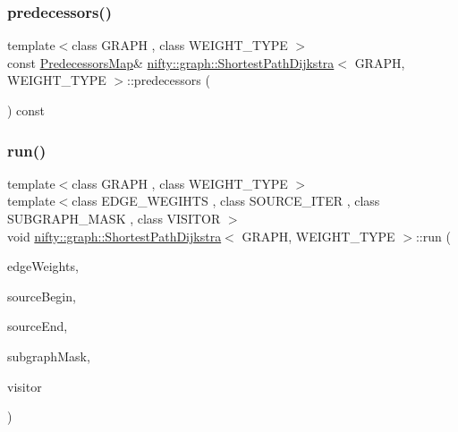 \mbox{\label{classnifty_1_1graph_1_1ShortestPathDijkstra_af00403d368fb8128d37a8bc736631245}} 
\subsubsection{\texorpdfstring{predecessors()}{predecessors()}}
{\footnotesize\ttfamily template$<$class G\+R\+A\+PH , class W\+E\+I\+G\+H\+T\+\_\+\+T\+Y\+PE $>$ \\
const \hyperlink{classnifty_1_1graph_1_1ShortestPathDijkstra_a87227c1cb37963c6a826889c693ab906}{Predecessors\+Map}\& \hyperlink{classnifty_1_1graph_1_1ShortestPathDijkstra}{nifty\+::graph\+::\+Shortest\+Path\+Dijkstra}$<$ G\+R\+A\+PH, W\+E\+I\+G\+H\+T\+\_\+\+T\+Y\+PE $>$\+::predecessors (\begin{DoxyParamCaption}{ }\end{DoxyParamCaption}) const\hspace{0.3cm}{\ttfamily [inline]}}

\mbox{\label{classnifty_1_1graph_1_1ShortestPathDijkstra_a3772fbcff8a5baa69b3884e69849380d}} 
\subsubsection{\texorpdfstring{run()}{run()}}
{\footnotesize\ttfamily template$<$class G\+R\+A\+PH , class W\+E\+I\+G\+H\+T\+\_\+\+T\+Y\+PE $>$ \\
template$<$class E\+D\+G\+E\+\_\+\+W\+E\+G\+I\+H\+TS , class S\+O\+U\+R\+C\+E\+\_\+\+I\+T\+ER , class S\+U\+B\+G\+R\+A\+P\+H\+\_\+\+M\+A\+SK , class V\+I\+S\+I\+T\+OR $>$ \\
void \hyperlink{classnifty_1_1graph_1_1ShortestPathDijkstra}{nifty\+::graph\+::\+Shortest\+Path\+Dijkstra}$<$ G\+R\+A\+PH, W\+E\+I\+G\+H\+T\+\_\+\+T\+Y\+PE $>$\+::run (\begin{DoxyParamCaption}\item[{E\+D\+G\+E\+\_\+\+W\+E\+G\+I\+H\+TS}]{edge\+Weights,  }\item[{S\+O\+U\+R\+C\+E\+\_\+\+I\+T\+ER}]{source\+Begin,  }\item[{S\+O\+U\+R\+C\+E\+\_\+\+I\+T\+ER}]{source\+End,  }\item[{const S\+U\+B\+G\+R\+A\+P\+H\+\_\+\+M\+A\+SK \&}]{subgraph\+Mask,  }\item[{V\+I\+S\+I\+T\+OR \&\&}]{visitor }\end{DoxyParamCaption})\hspace{0.3cm}{\ttfamily [inline]}}

